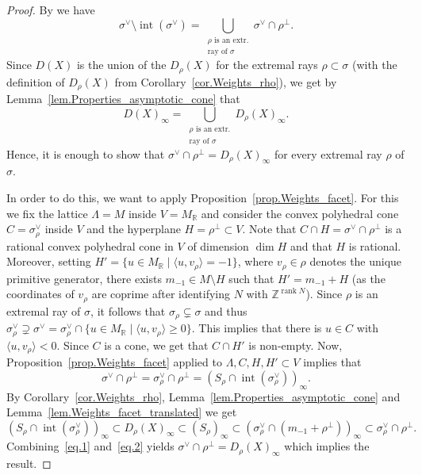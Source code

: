 \documentclass[11pt]{article}
\numberwithin{equation}{section}
\let\oldvee\vee
\renewcommand{\vee}{{\scriptscriptstyle\oldvee}}
\let\oldbot\bot
\renewcommand{\bot}{{\scriptscriptstyle\oldbot}}
\theoremstyle{plain}
\theoremstyle{definition}
\DeclareMathOperator{\rank}{rank}
\DeclareMathOperator{\inter}{int}
\newcommand{\RR}{\mathbb{R}}
\newcommand{\ZZ}{\mathbb{Z}}
\newcommand{\set}[2]{\{#1 \mid #2\}}
\newcommand{\sprod}[2]{\langle #1, #2 \rangle}
\begin{document}
\begin{proof}
By \cite[Propty\,(7), p.\,10]{Fu1993Introduction-to-to} we have
\[
\sigma^\vee \setminus \inter(\sigma^\vee) = \bigcup_{\substack{
\textrm{$\rho$ is an extr.} \\
\textrm{ray of $\sigma$}
}} \sigma^\vee \cap \rho^\bot.
\]
Since $D(X)$ is the union of the $D_{\rho}(X)$ for the extremal rays $\rho \subset \sigma$
(with the definition of $D_\rho(X)$ from Corollary~\ref{cor.Weights_rho}),
we get by Lemma~\ref{lem.Properties_asymptotic_cone} that
\[
D(X)_{\infty} = \bigcup_{\substack{
\textrm{$\rho$ is an extr.} \\
\textrm{ray of $\sigma$}
}} D_{\rho}(X)_{\infty}.
\]
Hence, it is enough to show that $\sigma^\vee \cap \rho^\bot = D_{\rho}(X)_{\infty}$
for every extremal ray $\rho$ of $\sigma$.

In order to do this,
we want to apply Proposition~\ref{prop.Weights_facet}.
For this we fix the lattice $\Lambda = M$ inside $V = M_{\RR}$ and consider
the convex polyhedral cone $C =\sigma_{\rho}^\vee$ inside $V$
and the hyperplane $H = \rho^\bot \subset V$. Note that
$C \cap H = \sigma^\vee \cap \rho^\bot$ is a rational convex polyhedral cone in $V$ of dimension
$\dim H$ and that $H$ is rational.
Moreover, setting $H' = \set{u \in M_{\RR}}{\sprod{u}{v_{\rho}} =-1}$, where $v_\rho \in \rho$
denotes the unique primitive generator,
there exists $m_{-1} \in M \setminus H$ such that $H' = m_{-1} + H$ (as the coordinates
of $v_{\rho}$ are coprime after identifying $N$ with $\ZZ^{\rank N}$).
Since $\rho$ is an extremal ray
of $\sigma$, it follows that $\sigma_{\rho} \subsetneq \sigma$ and thus
$\sigma_{\rho}^\vee \supsetneq \sigma^\vee =
\sigma_{\rho}^\vee \cap \set{u \in M_{\RR}}{\sprod{u}{v_{\rho}}\geq 0}$. This implies that
there is $u \in C$ with $\sprod{u}{v_{\rho}}<0$. Since $C$
is a cone, we get that $C \cap H'$ is non-empty. Now, Proposition~\ref{prop.Weights_facet} applied to $\Lambda, C, H, H' \subset V$
implies that
\[
\label{eq.1}
\tag{d}
\sigma^\vee \cap \rho^\bot = \sigma_{\rho}^\vee \cap \rho^\bot =
(S_{\rho} \cap \inter(\sigma_{\rho}^\vee))_{\infty}.
\]
By Corollary~\ref{cor.Weights_rho}, Lemma~\ref{lem.Properties_asymptotic_cone}
and Lemma~\ref{lem.Weights_facet_translated} we get
\[
\label{eq.2}
\tag{e}
(S_{\rho} \cap \inter(\sigma_{\rho}^\vee))_{\infty} \subset D_{\rho}(X)_{\infty}
\subset (S_{\rho})_{\infty}
\subset (\sigma_{\rho}^\vee \cap (m_{-1} + \rho^\bot))_{\infty}
\subset \sigma_{\rho}^\vee \cap \rho^\bot
.
\]
Combining~\eqref{eq.1} and~\eqref{eq.2} yields
$\sigma^\vee \cap \rho^\bot = D_{\rho}(X)_{\infty}$ which implies the result.
\end{proof}
\end{document}
